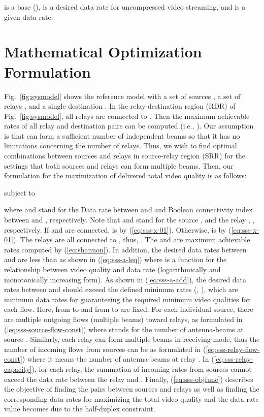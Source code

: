 \documentclass[conference]{IEEEtran}
\begin{document}
 is a base (),  is a desired data rate for uncompressed video streaming, and  is a given data rate.



\section{Mathematical Optimization Formulation}\label{sec:jscr}


Fig.~\ref{fig:sysmodel} shows the reference model with a set of sources , a set of relays , and a single destination .
In the relay-destination region (RDR) of Fig.~\ref{fig:sysmodel}, all relays are connected to .
Then the maximum achievable rates of all relay and destination pairs can be computed (i.e., ). Our assumption is that  can form a sufficient number of independent beams so that it has no limitations concerning the number of relays.
Thus, we wish to find optimal combinations between sources and relays in source-relay region (SRR) for the settings that both sources and relays can form multiple beams.
Then, our formulation for the maximization of delivered total video quality is as follows:

subject to

where  and  stand for the Data rate between  and  and Boolean connectivity index between  and , respectively. Note that  and  stand for the source ,  and the relay , , respectively.
If  and  are connected,  is  by (\ref{eq:sss-x-01}). Otherwise,  is  by (\ref{eq:sss-x-01}).
The relays are all connected to , thus, .
The  and  are maximum achievable rates computed by (\ref{eq:shannon}).
In addition, the desired data rates between  and  are less than  as shown in (\ref{eq:sss-a-leq}) where  is a function for the relationship between video quality and data rate (logarithmically and monotonically increasing form).
As shown in (\ref{eq:sss-a-add}), the desired data rates between  and  should exceed the defined minimum rates (, ), which are minimum data rates for guaranteeing the required minimum video qualities for each flow.
Here,  from  to  and  from  to  are fixed.
For each individual source, there are multiple outgoing flows (multiple beams) toward relays, as formulated in (\ref{eq:sss-source-flow-const}) where  stands for the number of antenna-beams at source .
Similarly, each relay can form multiple beams in receiving mode, thus the number of incoming flows from sources can be  as formulated in (\ref{eq:sss-relay-flow-const}) where it means the number of antenna-beams at relay .
In (\ref{eq:sss-relay-capacity}), for each relay, the summation of incoming rates from sources cannot exceed the data rate between the relay and .
Finally, (\ref{eq:sss-objfunc}) describes the objective of finding the pairs between sources and relays as well as finding the corresponding data rates for maximizing the total video quality and the data rate value becomes  due to the half-duplex constraint.
\end{document}
